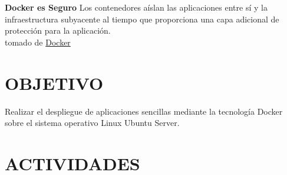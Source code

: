 \documentclass[10pt]{article}   			%
\begin{document}
\textbf{Docker es Seguro}
Los contenedores aíslan las aplicaciones entre sí y la infraestructura subyacente al tiempo que proporciona una capa adicional de protección para la aplicación.\\
tomado de \href{https://www.docker.com/what-docker}{Docker}



\section{OBJETIVO}
Realizar el despliegue de aplicaciones sencillas mediante la tecnología Docker sobre el sistema operativo Linux Ubuntu Server.
\section{ACTIVIDADES}	
\end{document}
